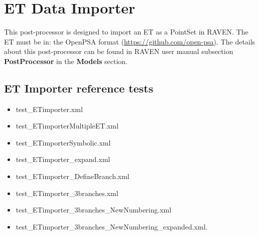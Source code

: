 \section{ET Data Importer}
\label{sec:ETdataImporter}

This post-processor is designed to import an ET as a PointSet in RAVEN.
The ET must be in: the OpenPSA format (\href{<url>}{https://github.com/open-psa}).
The details about this post-processor can be found in RAVEN user manual subsection \textbf{PostProcessor}
in the \textbf{Models} section.

\subsection{ET Importer reference tests}
\begin{itemize}
	\item test\_ETimporter.xml
	\item test\_ETimporterMultipleET.xml
	\item test\_ETimporterSymbolic.xml
	\item test\_ETimporter\_expand.xml
	\item test\_ETimporter\_DefineBranch.xml
	\item test\_ETimporter\_3branches.xml
	\item test\_ETimporter\_3branches\_NewNumbering.xml
	\item test\_ETimporter\_3branches\_NewNumbering\_expanded.xml.
\end{itemize}
